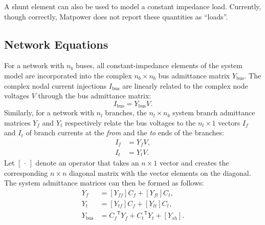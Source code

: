 \documentclass[12pt]{article}
\newcommand{\matpower}[0]{{\sc Matpower}}
\newcommand{\trans}[1]{{#1}^{\ensuremath{\mathsf{T}}}}  %
\newcommand{\diag}[1]{\left[{#1}\right]}                %
\numberwithin{equation}{section}
\numberwithin{table}{section}
\numberwithin{figure}{section}
\begin{document}
A shunt element can also be used to model a constant impedance load.
Currently, though correctly, \matpower{} does not report these quantities as ``loads''.


\subsection{Network Equations}

For a network with $n_b$ buses, all constant-impedance elements of the system model are incorporated into
the complex $n_b \times n_b$ bus admittance matrix $Y_\mathrm{bus}$.
The complex nodal current injections $I_\mathrm{bus}$ are linearly related 
to the complex node voltages $V$ through the bus admittance matrix:
\begin{equation}
I_\mathrm{bus} = Y_\mathrm{bus} V. \label{eq:Ibus}
\end{equation}
Similarly, for a network with $n_l$ branches,
the $n_l \times n_b$ system branch admittance matrices $Y_f$ and $Y_t$ respectively relate the bus voltages
to the $n_l \times 1$ vectors $I_f$ and $I_t$ of branch currents at the \emph{from} and the \emph{to} ends of the branches:
\begin{align}
I_f &= Y_f V, \label{eq:If} \\
I_t &= Y_t V. \label{eq:It}
\end{align}
Let $\diag{\,\cdot\,}$ denote an operator that takes an $n \times 1$ vector
and creates the corresponding $n \times n$ diagonal matrix with the vector elements on the diagonal.
The system admittance matrices can then be formed as follows:
\begin{align}
Y_f &= \diag{ Y_{f\!f} } C_f + \diag{ Y_{ft} } C_t, \label{eq:Yf} \\
Y_t &= \diag{ Y_{t\!f} } C_f + \diag{ Y_{tt} } C_t, \label{eq:Yt} \\
Y_\mathrm{bus} &= \trans{C_f \!} Y_f + \trans{C_t \!} Y_t + \diag{ Y_{sh} }. \label{eq:Ybus}
\end{align}
\end{document}
